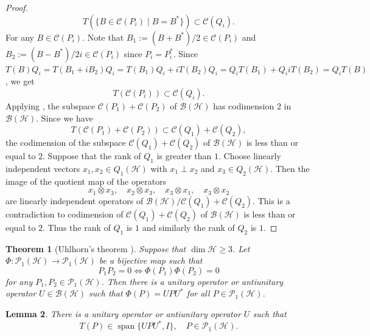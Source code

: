 \documentclass[11pt]{amsart}
\newtheorem{theorem}{Theorem}
\newtheorem{lemma}[theorem]{Lemma}
\theoremstyle{remark}
\newcommand{\BH}{\mathcal{B(H)}}
\newcommand{\cH}{{\mathcal{H}}}
\newcommand{\PH}{\mathcal{P}_1(\cH)}
\begin{document}
\begin{proof}
\[
T(\{ B \in \mathcal{C}(P_i) \mid B=B^{*}\} ) \subset \mathcal{C}(Q_i).
\]
For any $B \in \mathcal{C}(P_i)$. Note that $B_1:=(B+B^{*})/2 \in \mathcal{C}(P_i)$ and $B_2:=(B-B^{*})/2i \in \mathcal{C}(P_i)$ since $P_i=P_i^{*}$. Since  $T(B)Q_i=T(B_1+iB_2)Q_i=T(B_1)Q_i+iT(B_2)Q_i=Q_iT(B_1)+Q_iiT(B_2)=Q_iT(B)$, we get
\[
T( \mathcal{C}(P_i)  ) \subset \mathcal{C}(Q_i).
\]
Applying \cite[Lemma 3.2]{Oml},  the subspace $ \mathcal{C}(P_1)+ \mathcal{C}(P_2)$ of $\BH$ has codimension $2$ in $\BH$. Since we have
\[
T(\mathcal{C}(P_1)+ \mathcal{C}(P_2)) \subset \mathcal{C}(Q_1) + \mathcal{C}(Q_2), 
\]
the codimension of the subspace $ \mathcal{C}(Q_1)+ \mathcal{C}(Q_2)$ of $\BH$ is less than or equal to $2$.  
 Suppose that the rank of $Q_1$ is greater than $1$.  Choose linearly independent vectors $x_1, x_2 \in Q_1(\cH)$ with $x_1 \perp x_2$ and $x_3 \in Q_2(\cH)$. Then the image of the quotient map of the operators
\[
x_1 \otimes x_3, \quad x_2 \otimes x_3, \quad x_3 \otimes x_1, \quad x_3 \otimes x_2
\]
are linearly independent operators of $\BH/\mathcal{C}(Q_1) + \mathcal{C}(Q_2)$. This is a contradiction to codimension of $ \mathcal{C}(Q_1)+ \mathcal{C}(Q_2)$ of $\BH$ is less than or equal to $2$. Thus the rank of $Q_1$ is $1$ and similarly the rank of $Q_2$ is $1$.
\end{proof}

\begin{theorem}[Uhlhorn's theorem \cite{UHL}]
    Suppose that $\dim \cH \ge 3$. Let $\Phi: \PH \to \PH$ be a bijective map such that 
    \[
P_1P_2=0 \Longleftrightarrow \Phi(P_1)\Phi(P_2)=0
    \]
    for any $P_1, P_2 \in \PH$. Then there is a unitary operator or antiunitary operator $U \in \BH$ such that $\Phi(P)=UPU^{*}$ for all $P \in \PH$. 
    
\end{theorem}

\begin{lemma}\label{UHL}
There is a unitary operator or antiunitary operator $U$ such that 
\[
T(P) \in \operatorname{span}\{UPU^{*}, I\} , \quad P \in \PH.
\]
\end{lemma}
\end{document}
